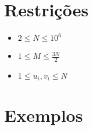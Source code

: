 \section*{Restrições}

\begin{itemize}
  \item $2 \leq N \leq 10^{6}$
  \item $1 \leq M \leq \frac{3N}{2}$
  \item $1 \leq u_i, v_i \leq N$
\end{itemize}

\section*{Exemplos}
\exemplo
